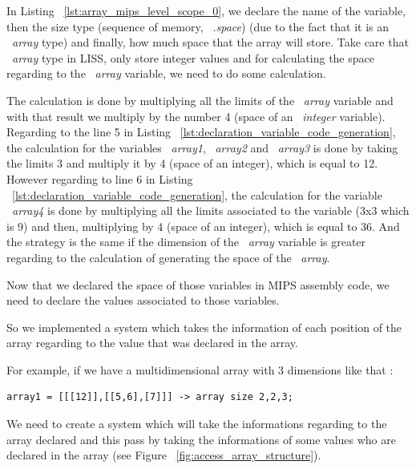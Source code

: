 \documentclass[
  oneside,
  11pt, a4paper,
  footinclude=true,
  headinclude=true,
  cleardoublepage=empty
]{scrbook}
\begin{document}
In Listing ~\ref{lst:array_mips_level_scope_0}, we declare the name of the variable, then the size type (sequence of memory, ~\textit{.space}) (due to the fact that it is an ~\textit{array} type) and finally, how much space that the array will store.
Take care that ~\textit{array} type in LISS, only store integer values and for calculating the space regarding to the ~\textit{array} variable, we need to do some calculation. 

The calculation is done by multiplying all the limits of the ~\textit{array} variable and with that result we multiply by the number 4 (space of an ~\textit{integer} variable).
Regarding to the line 5 in Listing ~\ref{lst:declaration_variable_code_generation}, the calculation for the variables ~\textit{array1}, ~\textit{array2} and ~\textit{array3} is done by taking the limits 3 and multiply it by 4 (space of an integer), which is equal to 12.
However regarding to line 6 in Listing ~\ref{lst:declaration_variable_code_generation}, the calculation for the variable ~\textit{array4} is done by multiplying all the limits associated to the variable (3x3 which is 9) and then, multiplying by 4 (space of an integer), which is equal to 36. And the strategy is the same if the dimension of the ~\textit{array} variable is greater regarding to the calculation of generating the space of the ~\textit{array}.

Now that we declared the space of those variables in MIPS assembly code, we need to declare the values associated to those variables.

So we implemented a system which takes the information of each position of the array regarding to the value that was declared in the array.

For example, if we have a multidimensional array with 3 dimensions like that :

\begin{lstlisting}[caption={Example of an array with 3 dimensions},label={lst:array_with_3_dimension_example}]
  array1 = [[[12]],[[5,6],[7]]] -> array size 2,2,3;
\end{lstlisting}

We need to create a system which will take the informations regarding to the array declared and this pass by taking the informations of some values who are declared in the array (see Figure ~\ref{fig:access_array_structure}).
\end{document}
